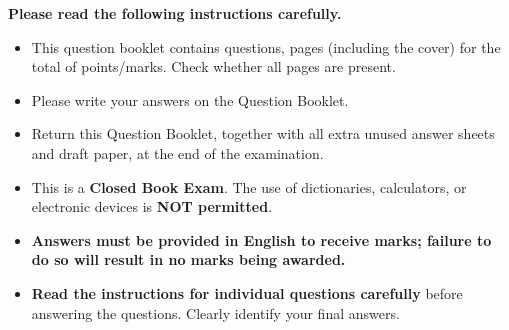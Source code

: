 \documentclass[12pt, a4paper, answers, addpoints]{exam}
\begin{document}
\vspace{0.5cm}

\noindent
\textbf{Please read the following instructions carefully.}
\begin{itemize}[leftmargin=*]
    \item This question booklet contains \textbf{\numquestions} questions, \textbf{\numpages} pages (including the cover) for the total of \textbf{\numpoints} points/marks. Check whether all pages are present.
    
    \item Please write your answers on the Question Booklet.
    
    \item Return this Question Booklet, together with all extra unused answer sheets and draft paper, at the end of the examination.
    
    \item This is a \textbf{Closed Book Exam}. The use of dictionaries, calculators, or electronic devices is \textbf{NOT permitted}.
    
    \item \textbf{Answers must be provided in English to receive marks; failure to do so will result in no marks being awarded.}

    \item \textbf{Read the instructions for individual questions carefully} before answering the questions. Clearly identify your final answers.
\end{itemize}


\vfill
\end{document}
